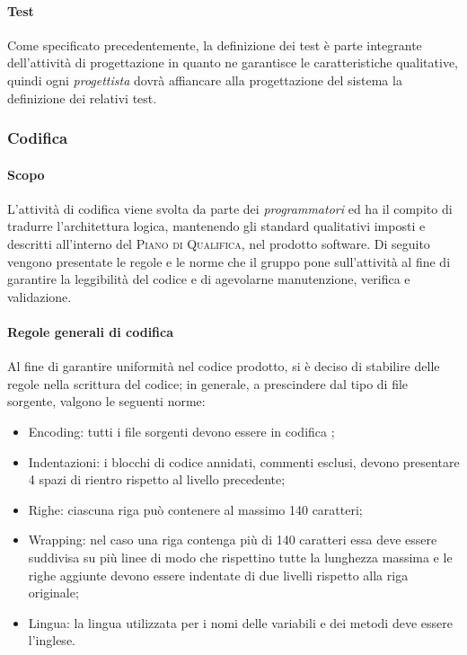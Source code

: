\paragraph{Test}

Come specificato precedentemente, la definizione dei test è parte integrante dell'attività di progettazione in quanto ne garantisce le 
caratteristiche qualitative, quindi ogni \emph{progettista} dovrà affiancare alla progettazione del sistema la definizione dei relativi test.

\subsubsection{Codifica}
\label{ssub:codifica}
 
\paragraph{Scopo}
\label{par:codifica:scopo}

L'attività di codifica viene svolta da parte dei \emph{programmatori} ed ha il compito di tradurre l'architettura logica, mantenendo gli 
standard qualitativi imposti e descritti all'interno del \textsc{Piano di Qualifica}, nel prodotto software. Di seguito vengono presentate 
le regole e le norme che il gruppo pone sull'attività al fine di garantire la leggibilità del codice e di agevolarne manutenzione, 
verifica e validazione.

\paragraph{Regole generali di codifica}
\label{par:stile_codifica}

Al fine di garantire uniformità nel codice prodotto, si è deciso di stabilire delle regole nella scrittura del codice; in generale, a 
prescindere dal tipo di file sorgente, valgono le seguenti norme:
\begin{itemize}
	\item Encoding: tutti i file sorgenti devono essere in codifica ;
    \item Indentazioni: i blocchi di codice annidati, commenti esclusi, devono presentare 4 spazi di rientro rispetto al livello precedente;
    \item Righe: ciascuna riga può contenere al massimo 140 caratteri;
    \item Wrapping: nel caso una riga contenga più di 140 caratteri essa deve essere suddivisa su più linee di modo che rispettino tutte 
    	la lunghezza massima e le righe aggiunte devono essere indentate di due livelli rispetto alla riga originale;
    \item Lingua: la lingua utilizzata per i nomi delle variabili e dei metodi deve essere l'inglese.
\end{itemize}



